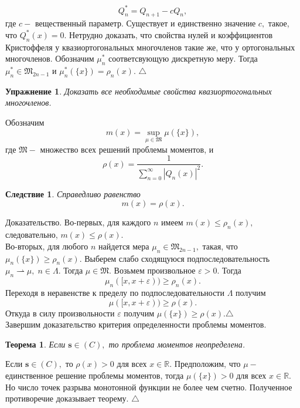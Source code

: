 \documentclass[12 pt, a4 paper]{article}
\theoremstyle{plain}   \newtheorem{Pro}{Задача}
\newtheorem{The}{Теорема}
\newtheorem{Cor}{Следствие}
\newtheorem{Exe}{Упражнение}
\begin{document}
$$
  Q_n ^{\ast} = Q_{n+1}-cQ_n ,
$$
где
$ c - $
вещественный параметр. Существует и единственно значение
$ c , $
такое, что
$ Q_n ^{\ast} (x)=0. $
Нетрудно доказать, что свойства нулей и коэффициентов Кристоффеля
у квазиортогональных многочленов такие же, что у ортогональных
многочленов. Обозначим
$ \mu _n ^{\ast} $
соответсвующую дискретную меру. Тогда
$ \mu _n ^{\ast} \in \mathfrak{M}_{2n-1} $
и
$ \mu _n ^{\ast} (\{x \} ) = \rho _n (x) . $
$ \triangle $
\begin{Exe}
Доказать все необходимые свойства квазиортогональных многочленов.
\end{Exe}
Обозначим
$$
  m(x)=\sup _{\mu \in \mathfrak{M}} \mu ( \{ x \} ) ,
$$
где
$ \mathfrak{M} - $
множество всех решений проблемы моментов, и
$$
  \rho (x) = \frac{1}{\sum _{n=0}^{\infty}
  |Q_n (x)|^2 } .
$$
\begin{Cor}
Справедливо равенство
$$
  m(x)=\rho (x) .
$$
\end{Cor}
{\Large Доказательство.}
Во-первых, для каждого $ n $ имеем
$  m(x) \leq \rho _n (x) , $
следовательно,
$ m(x) \leq \rho (x) . $
\\
Во-вторых, для любого $ n $ найдется мера
$ \mu _n \in \mathfrak{M}_{2n-1} , $
такая, что
$ \mu _n (\{ x \} ) \geq \rho _n (x) . $
Выберем слабо сходящуюся подпоследовательность
$ \mu _n \rightharpoonup \mu , \; n \in \Lambda . $
Тогда
$ \mu \in \mathfrak{M} . $
Возьмем произвольное
$ \varepsilon >0 . $
Тогда
$$
  \mu _n ([x,x+\varepsilon )) \geq \rho _n (x).
$$
Переходя в неравенстве к пределу по подпоследовательности
$ \Lambda $
получим
$$
  \mu ([x,x+\varepsilon)) \geq \rho (x) .
$$
Откуда в силу произвольности
$ \varepsilon $
получим
$ \mu ( \{ x \} ) \geq \rho (x) . \triangle $
\\

Завершим доказательство критерия определенности проблемы моментов.
\begin{The}
Если
$ \mathbf{s} \in (C), $
то проблема моментов неопределена.
\end{The}
Если
$ \mathbf{s} \in (C) , $
то
$ \rho (x)>0 $
для всех
$ x \in \mathbb{R} . $
Предположим, что
$ \mu - $
единственное решение проблемы моментов, тогда
$ \mu ( \{ x \} ) >0 $
для всех
$ x \in \mathbb{R} . $
Но число точек разрыва монотонной функции не более чем счетно.
Полученное противоречие доказывает теорему.
$ \triangle $
\newpage
\end{document}
